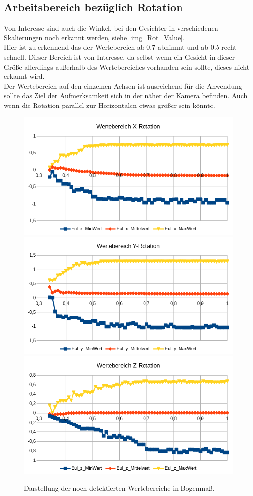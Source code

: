 \subsection{Arbeitsbereich bezüglich Rotation}
Von Interesse sind auch die Winkel, bei den Gesichter in verschiedenen Skalierungen noch erkannt werden, siehe \autoref{img_Rot_Value}.\\
Hier ist zu erkennend das der Wertebereich ab 0.7 abnimmt und ab 0.5 recht schnell. Dieser Bereich ist von Interesse, da selbst wenn ein Gesicht in dieser Größe allerdings außerhalb des Wertebereiches vorhanden sein sollte, dieses nicht erkannt wird.\\
Der Wertebereich auf den einzelnen Achsen ist ausreichend für die Anwendung sollte das Ziel der Aufmerksamkeit sich in der näher der Kamera befinden. Auch wenn die Rotation parallel zur Horizontalen etwas größer sein könnte.
\begin{figure}
	\centering
	\includegraphics[width=0.3\linewidth]{tabelle/X_Rot}
	\includegraphics[width=0.3\linewidth]{tabelle/Y_Rot}
	\includegraphics[width=0.3\linewidth]{tabelle/Z_Rot}
	\caption{Darstellung der noch detektierten Wertebereiche in Bogenmaß.}
	\label{img_Rot_Value}
\end{figure}